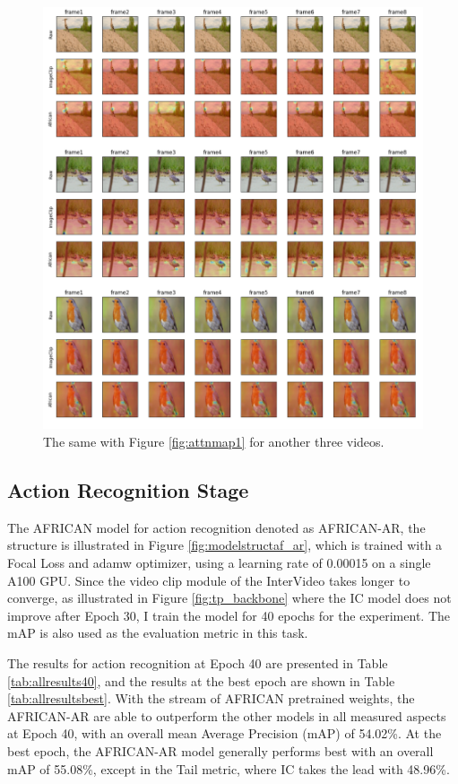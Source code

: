 \begin{figure}[ht]
    \centering
    \includegraphics[width=1.0\textwidth]{assets/imgs/5_4_AttentionMaps_2}
    \caption[Attention Map 1]{The same with Figure \ref{fig:attnmap1} for another three videos.}
    \label{fig:attnmap2}
\end{figure}







\subsection{Action Recognition Stage}
The AFRICAN model for action recognition denoted as AFRICAN-AR, the structure is illustrated in Figure \ref{fig:modelstructaf_ar}, which is trained with a Focal Loss and adamw optimizer, using a learning rate of 0.00015 on a single A100 GPU. Since the video clip module of the InterVideo takes longer to converge, as illustrated in Figure \ref{fig:tp_backbone} where the IC model does not improve after Epoch 30, I train the model for 40 epochs for the experiment. The mAP is also used as the evaluation metric in this task.

The results for action recognition at Epoch 40 are presented in Table \ref{tab:allresults40}, and the results at the best epoch are shown in Table \ref{tab:allresultsbest}. With the stream of AFRICAN pretrained weights, the AFRICAN-AR are able to outperform the other models in all measured aspects at Epoch 40, with an overall mean Average Precision (mAP) of 54.02\%. At the best epoch, the AFRICAN-AR model generally performs best with an overall mAP of 55.08\%, except in the Tail metric, where IC takes the lead with 48.96\%.


